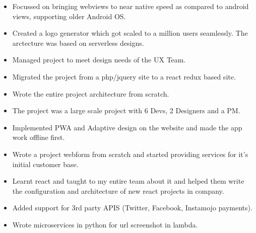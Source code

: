 \documentclass[10pt,a4paper,ragged2e,withhyper]{altacv}
\begin{document}
\begin{paracol}{2}


\begin{itemize}
\item Focussed on bringing webviews to near native speed as compared to android views, supporting older Android OS.
\item Created a logo generator which got scaled to a million users seamlessly. The arctecture was based on serverless designs.
\end{itemize}

\divider

\begin{itemize}
\item Managed project to meet design needs of the UX Team.
\item Migrated the project from a php/jquery site to a react redux based site.
\item Wrote the entire project architecture from scratch.
\item The project was a large scale project with 6 Devs, 2 Designers and a PM.
\item Implemented PWA and Adaptive design on the website and made the app work offline first.
\end{itemize}

\divider


\begin{itemize}
\item Wrote a project webform from scratch and started providing services for it's initial customer base.
\item Learnt react and taught to my entire team about it and helped them write the configuration and architecture of new react projects in company.
\item Added support for 3rd party APIS (Twitter, Facebook, Instamojo payments).
\item Wrote microservices in python for url screenshot in lambda.
\end{itemize}

\divider


\end{paracol}
\end{document}
